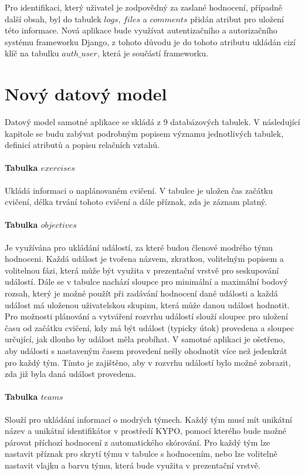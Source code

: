 \documentclass[
  digital,
  twoside,
  table, 
  nolof, 
  nolot
]{fithesis3}
\begin{document}
Pro identifikaci, který uživatel je zodpovědný za zaslané hodnocení, případně další obsah, byl do tabulek $logs$, $files$ a $comments$ přidán atribut pro uložení této informace. Nová aplikace bude využívat autentizačního a autorizačního systému frameworku Django, z tohoto důvodu je do tohoto atributu ukládán cizí klíč na tabulku $auth\_user$, která je součástí frameworku.

\section{Nový datový model}

Datový model samotné aplikace se skládá z 9 databázových tabulek. V následující kapitole se budu zabývat podrobným popisem významu jednotlivých tabulek, definicí atributů a popisu relačních vztahů.

\paragraph{Tabulka $exercises$} Ukládá informaci o naplánovaném cvičení. V tabulce je uložen čas začátku cvičení, délka trvání tohoto cvičení a dále příznak, zda je záznam platný.

\paragraph{Tabulka $objectives$} Je využívána pro ukládání událostí, za které budou členové modrého týmu hodnoceni. Každá událost je tvořena názvem, zkratkou, volitelným popisem a volitelnou fázi, která může být využita v prezentační vrstvě pro seskupování událostí. Dále se v tabulce nachází sloupce pro minimální a maximální bodový rozsah, který je možné použít při zadávání hodnocení dané události a každá událost má uloženou uživatelskou skupinu, která může danou událost hodnotit. Pro možnosti plánování a vytváření rozvrhu událostí slouží sloupec pro uložení času od začátku cvičení, kdy má být událost (typicky útok) provedena a sloupec určující, jak dlouho by událost měla probíhat. V samotné aplikaci je ošetřeno, aby události s nastaveným časem provedení nešly ohodnotit více než jedenkrát pro každý tým. Tímto je zajištěno, aby v rozvrhu událostí bylo možné zobrazit, zda již byla daná událost provedena. 

\paragraph{Tabulka $teams$} Slouží pro ukládání informací o modrých týmech. Každý tým musí mít unikátní název a unikátní identifikátor v prostředí KYPO, pomocí kterého bude možné párovat příchozí hodnocení z automatického skórování. Pro každý tým lze nastavit příznak pro skrytí týmu v tabulce s hodnocením, nebo lze volitelně nastavit vlajku a barvu týmu, která bude využita v prezentační vrstvě.
\end{document}
